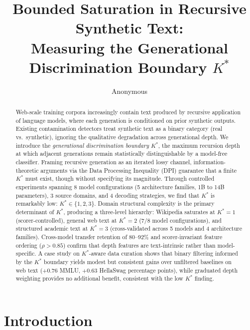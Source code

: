 \documentclass[11pt]{article}
\title{Bounded Saturation in Recursive Synthetic Text:\\Measuring the Generational Discrimination Boundary $K^*$}
\author{Anonymous}
\date{}
\begin{document}
\maketitle

\begin{abstract}
Web-scale training corpora increasingly contain text produced by recursive application of language models, where each generation is conditioned on prior synthetic outputs. Existing contamination detectors treat synthetic text as a binary category (real vs.\ synthetic), ignoring the qualitative degradation across generational depth. We introduce the \emph{generational discrimination boundary} $K^*$, the maximum recursion depth at which adjacent generations remain statistically distinguishable by a model-free classifier. Framing recursive generation as an iterated lossy channel, information-theoretic arguments via the Data Processing Inequality (DPI) guarantee that a finite $K^*$ must exist, though without specifying its magnitude. Through controlled experiments spanning 8 model configurations (5 architecture families, 1B to 14B parameters), 3 source domains, and 4 decoding strategies, we find that $K^*$ is remarkably low: $K^* \in \{1,2,3\}$. Domain structural complexity is the primary determinant of $K^*$, producing a three-level hierarchy: Wikipedia saturates at $K^*{=}1$ (scorer-controlled), general web text at $K^*{=}2$ (7/8 model configurations), and structured academic text at $K^*{=}3$ (cross-validated across 5 models and 4 architecture families). Cross-model transfer retention of 80--92\% and scorer-invariant feature ordering ($\rho > 0.85$) confirm that depth features are text-intrinsic rather than model-specific. A case study on $K^*$-aware data curation shows that binary filtering informed by the $K^*$ boundary yields modest but consistent gains over unfiltered baselines on web text ($+$0.76 MMLU, $+$0.63 HellaSwag percentage points), while graduated depth weighting provides no additional benefit, consistent with the low $K^*$ finding.
\end{abstract}

\section{Introduction}
\end{document}
